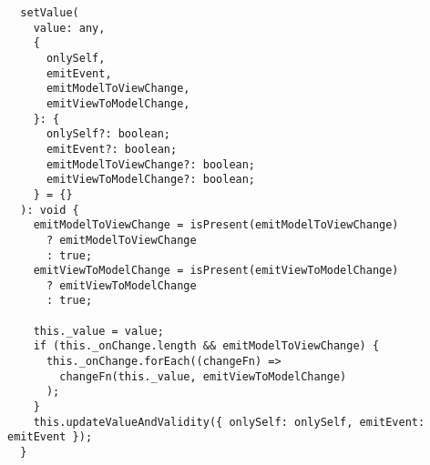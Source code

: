 \begin{verbatim}
  setValue(
    value: any,
    {
      onlySelf,
      emitEvent,
      emitModelToViewChange,
      emitViewToModelChange,
    }: {
      onlySelf?: boolean;
      emitEvent?: boolean;
      emitModelToViewChange?: boolean;
      emitViewToModelChange?: boolean;
    } = {}
  ): void {
    emitModelToViewChange = isPresent(emitModelToViewChange)
      ? emitModelToViewChange
      : true;
    emitViewToModelChange = isPresent(emitViewToModelChange)
      ? emitViewToModelChange
      : true;

    this._value = value;
    if (this._onChange.length && emitModelToViewChange) {
      this._onChange.forEach((changeFn) =>
        changeFn(this._value, emitViewToModelChange)
      );
    }
    this.updateValueAndValidity({ onlySelf: onlySelf, emitEvent: emitEvent });
  }
\end{verbatim}
